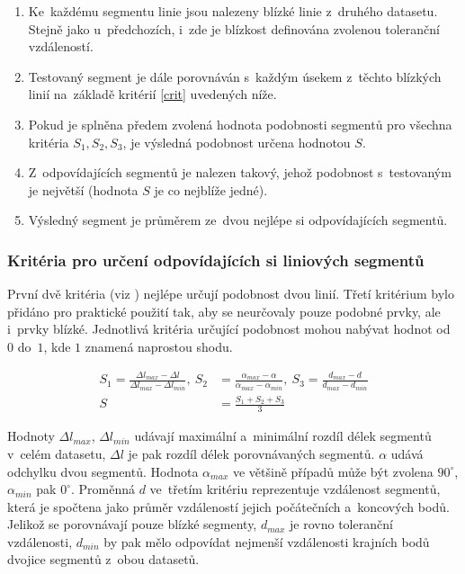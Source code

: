 \begin{enumerate}
 \item Ke~každému segmentu linie jsou nalezeny blízké linie z~druhého datasetu.
       Stejně jako u~předchozích, i~zde je blízkost definována zvolenou toleranční
       vzdáleností.
 \item Testovaný segment je dále porovnáván s~každým úsekem z~těchto blízkých
       linií na~základě kritérií \ref{crit} uvedených níže.
 \item Pokud je splněna předem zvolená hodnota podobnosti segmentů pro všechna 
       kritéria $S_1,S_2,S_3$, je výsledná podobnost určena hodnotou $S$.
 \item Z~odpovídajících segmentů je nalezen takový, jehož podobnost s~testovaným
       je největší (hodnota $S$ je co nejblíže jedné).
 \item Výsledný segment je průměrem ze~dvou nejlépe si odpovídajících segmentů.
\end{enumerate}

\subsubsection*{Kritéria pro určení odpovídajících si liniových segmentů}
První dvě kritéria (viz \cite{moosavi}) nejlépe určují podobnost dvou 
linií. Třetí kritérium bylo přidáno pro praktické použití tak, aby se neurčovaly
pouze podobné prvky, ale i~prvky blízké. Jednotlivá kritéria určující podobnost 
mohou nabývat hodnot od~$0$ do~$1$, kde $1$ znamená naprostou shodu.

\begin{equation}
 \begin{aligned}
 S_1 = \frac{ \Delta l_{max} - \Delta l }{ \Delta l_{max} - \Delta l_{min}},\ 
 S_2 &= \frac{ \alpha_{max} - \alpha }{ \alpha_{max} - \alpha_{min}},\ 
 S_3 = \frac{ d_{max} - d }{ d_{max} - d_{min}}\\
 S &= \frac{S_1+S_2+S_3}{3}
 \label{crit}
 \end{aligned}
\end{equation}

Hodnoty $\Delta l_{max}$, $\Delta l_{min}$ udávají maximální a~minimální rozdíl délek
segmentů v~celém datasetu, $\Delta l$ je pak rozdíl délek porovnávaných segmentů.
$\alpha$ udává odchylku dvou segmentů. Hodnota $\alpha_{max}$ ve většině případů může
být zvolena $90^{\circ}$, $\alpha_{min}$ pak $0^\circ$. Proměnná $d$ ve~třetím 
kritériu reprezentuje vzdálenost segmentů, která je spočtena jako průměr vzdáleností
jejich počátečních a~koncových bodů. Jelikož se porovnávají pouze blízké segmenty,
$d_{max}$ je rovno toleranční vzdálenosti, $d_{min}$ by pak mělo odpovídat nejmenší
vzdálenosti krajních bodů dvojice segmentů z~obou datasetů.


